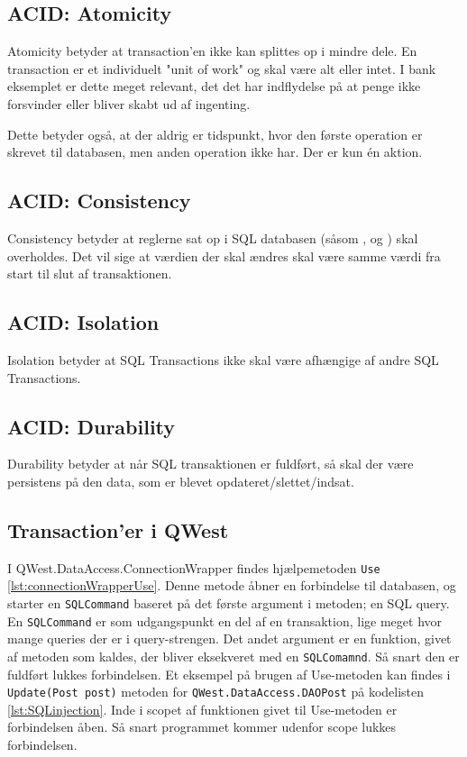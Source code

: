 \subsection{ACID: Atomicity}\label{sec:acidAtomic}
Atomicity betyder at transaction'en ikke kan splittes op i mindre dele. En transaction er et individuelt "unit of work" og skal være alt eller intet. \cite{DistributedSystems} I bank eksemplet er dette meget relevant, det det har indflydelse på at penge ikke forsvinder eller bliver skabt ud af ingenting. 

Dette betyder også, at der aldrig er tidspunkt, hvor den første operation er skrevet til databasen, men anden operation ikke har. Der er kun én aktion.

\subsection{ACID: Consistency}\label{sec:acidConsistent}
Consistency betyder at reglerne sat op i SQL databasen (såsom ,  og  \cite{SqlConstraints}) skal overholdes. Det vil sige at værdien der skal ændres skal være samme værdi fra start til slut af transaktionen.

\subsection{ACID: Isolation}\label{sec:acidIsolated}
Isolation betyder at SQL Transactions ikke skal være afhængige af andre SQL Transactions.

\subsection{ACID: Durability}\label{sec:acidDurable}
Durability betyder at når SQL transaktionen er fuldført, så skal der være persistens på den data, som er blevet opdateret/slettet/indsat.

\subsection{Transaction'er i QWest}\label{sec:transactionQwest}
I QWest.DataAccess.ConnectionWrapper findes hjælpemetoden \texttt{Use} \ref{lst:connectionWrapperUse}. Denne metode åbner en forbindelse til databasen, og starter en \texttt{SQLCommand} baseret på det første argument i metoden; en SQL query. En \texttt{SQLCommand} er som udgangspunkt en del af en transaktion, lige meget hvor mange queries der er i query-strengen. Det andet argument er en funktion, givet af metoden som kaldes, der bliver eksekveret med en \texttt{SQLComamnd}. Så snart den er fuldført lukkes forbindelsen. Et eksempel på brugen af Use-metoden kan findes i \texttt{Update(Post post)} metoden for \texttt{QWest.DataAccess.DAOPost} på kodelisten \ref{lst:SQLinjection}. Inde i scopet af funktionen givet til Use-metoden er forbindelsen åben. Så snart programmet kommer udenfor scope lukkes forbindelsen.

